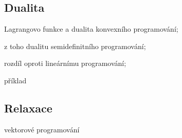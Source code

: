 \subsection*{Dualita}
\noindent Lagrangovo funkce a dualita konvexního programování;

\noindent z toho dualitu semidefinitního programování;

\noindent rozdíl oproti lineárnímu programování;

\noindent příklad

\subsection*{Relaxace}
\noindent vektorové programování

